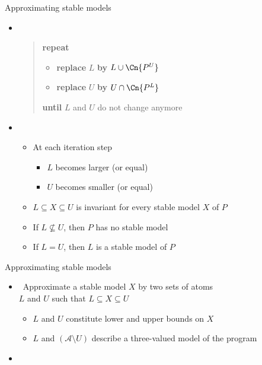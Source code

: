 \begin{frame}{Approximating stable models}
  \begin{itemize}
  \item {} \
    \medskip

    \begin{quote}
    \textbf{repeat}
    \begin{itemize}
    \item[] \textbf{replace} $L$ \textbf{by} $L\cup\Cn{P^U}$
    \item[] \textbf{replace} $U$ \textbf{by} $U\cap\Cn{P^L}$
    \end{itemize}
    \textbf{until} $L$ and $U$ do not change anymore
    \end{quote}

  \item<2->  \
    \begin{itemize}\normalsize
    \item At each iteration step
      \begin{itemize}
      \item $L$ becomes larger (or equal)
      \item $U$ becomes smaller (or equal)
      \end{itemize}
    \item $L\subseteq X\subseteq U$ is invariant for every stable model $X$ of $P$
      \medskip
    \item<3-> If $L\not\subseteq U$, then $P$ has no stable model
    \item<4-> If $L=U$, then $L$ is a stable model of $P$
    \end{itemize}
  \end{itemize}
\end{frame}
\begin{frame}{Approximating stable models}
  \medskip
  \begin{itemize}
  \item {} \ Approximate a stable model $X$ by two sets of atoms\\
    $L$ and $U$ such that
    \(
    L\subseteq X\subseteq U
    \)
    \begin{itemize}\normalsize
    \item  $L$ and $U$ constitute lower and upper bounds on $X$
    \item  $L$ and $(\mathcal{A}\setminus U)$ describe a three-valued model of the program
    \end{itemize}
    \smallskip
  \item {}
  \end{itemize}
\end{frame}
